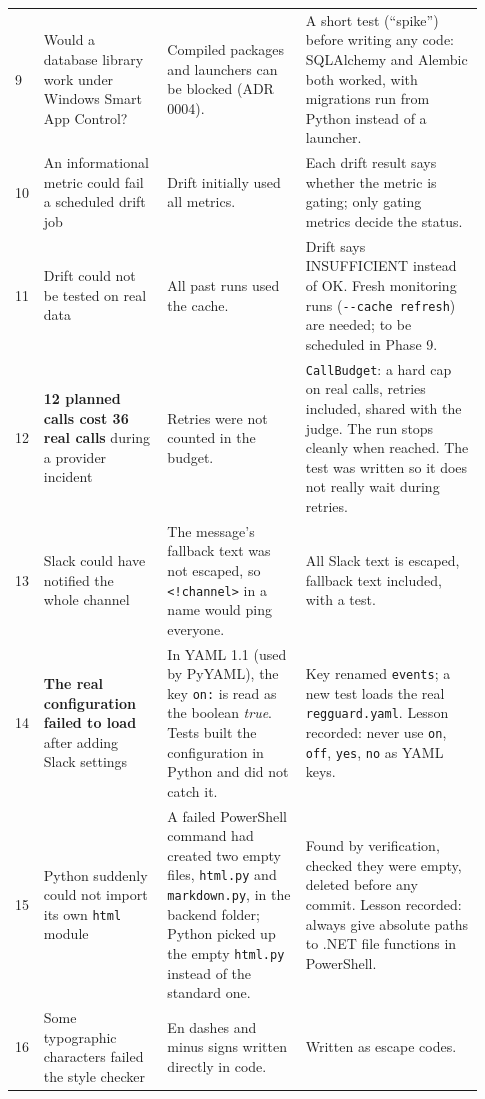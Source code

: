 \documentclass[11pt,a4paper]{article}
\newcommand{\code}[1]{\nolinkurl{#1}}
\begin{document}
\begin{longtable}{@{}p{0.03\linewidth}p{0.25\linewidth}p{0.29\linewidth}p{0.36\linewidth}@{}}
9 & Would a database library work under Windows Smart App Control? & Compiled packages and launchers can be blocked (ADR 0004). & A short test (``spike'') before writing any code: SQLAlchemy and Alembic both worked, with migrations run from Python instead of a launcher. \\
10 & An informational metric could fail a scheduled drift job & Drift initially used all metrics. & Each drift result says whether the metric is gating; only gating metrics decide the status. \\
11 & Drift could not be tested on real data & All past runs used the cache. & Drift says INSUFFICIENT instead of OK. Fresh monitoring runs (\texttt{-{}-cache refresh}) are needed; to be scheduled in Phase 9. \\
12 & \textbf{12 planned calls cost 36 real calls} during a provider incident & Retries were not counted in the budget. & \code{CallBudget}: a hard cap on real calls, retries included, shared with the judge. The run stops cleanly when reached. The test was written so it does not really wait during retries. \\
13 & Slack could have notified the whole channel & The message's fallback text was not escaped, so \texttt{<!channel>} in a name would ping everyone. & All Slack text is escaped, fallback text included, with a test. \\
14 & \textbf{The real configuration failed to load} after adding Slack settings & In YAML 1.1 (used by PyYAML), the key \code{on:} is read as the boolean \emph{true}. Tests built the configuration in Python and did not catch it. & Key renamed \code{events}; a new test loads the real \code{regguard.yaml}. Lesson recorded: never use \code{on}, \code{off}, \code{yes}, \code{no} as YAML keys. \\
15 & Python suddenly could not import its own \code{html} module & A failed PowerShell command had created two empty files, \code{html.py} and \code{markdown.py}, in the backend folder; Python picked up the empty \code{html.py} instead of the standard one. & Found by verification, checked they were empty, deleted before any commit. Lesson recorded: always give absolute paths to .NET file functions in PowerShell. \\
16 & Some typographic characters failed the style checker & En dashes and minus signs written directly in code. & Written as escape codes. \\
\bottomrule
\end{longtable}

\end{document}
